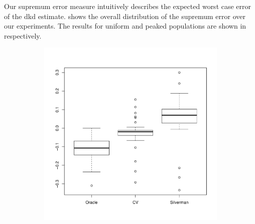 Our \gls{supremum error} measure intuitively describes the expected worst case error of the \gls{dkd} estimate.
 shows the overall distribution of the \gls{supremum error} over our experiments.
The results for uniform and peaked populations are shown in  respectively.

\begin{figure}[htbp]
    \centering
    \begin{subfigure}[t]{0.45\textwidth}
        \includegraphics[width=\textwidth]{results/by_overall/relative-peak-bias-boxplot}
        \label{fig:discussion:overall_peakbias_boxplot:unif}
    \end{subfigure}
    \begin{subfigure}[t]{0.45\textwidth}

\end{subfigure}
\end{figure}
